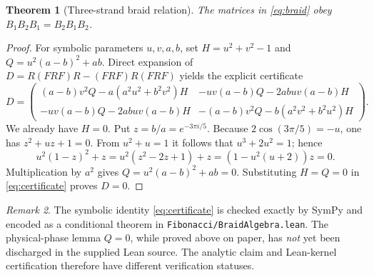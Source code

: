\documentclass[11pt,a4paper]{article}
\newtheorem{theorem}{Theorem}[section]
\theoremstyle{remark}
\newtheorem{remark}[theorem]{Remark}
\begin{document}
\begin{theorem}[Three-strand braid relation]\label{thm:braid}
The matrices in \eqref{eq:braid} obey $B_1B_2B_1=B_2B_1B_2$.
\end{theorem}
\begin{proof}
For symbolic parameters $u,v,a,b$, set
$H=u^2+v^2-1$ and $Q=u^2(a-b)^2+ab$. Direct expansion of
$D=R(FRF)R-(FRF)R(FRF)$ yields the explicit certificate
\begin{equation}\label{eq:certificate}
D=\begin{pmatrix}
(a-b)v^2Q-a(a^2u^2+b^2v^2)H & -uv(a-b)Q-2abuv(a-b)H\\
-uv(a-b)Q-2abuv(a-b)H & -(a-b)v^2Q-b(a^2v^2+b^2u^2)H
\end{pmatrix}.
\end{equation}
We already have $H=0$. Put $z=b/a=e^{-3\pi i/5}$. Because
$2\cos(3\pi/5)=-u$, one has $z^2+uz+1=0$. From $u^2+u=1$ it follows that $u^3+2u^2=1$; hence
\[
u^2(1-z)^2+z
=u^2(z^2-2z+1)+z
=(1-u^2(u+2))z=0.
\]
Multiplication by $a^2$ gives $Q=u^2(a-b)^2+ab=0$. Substituting $H=Q=0$ in \eqref{eq:certificate} proves $D=0$.
\end{proof}

\begin{remark}
The symbolic identity \eqref{eq:certificate} is checked exactly by SymPy and encoded as a conditional theorem in \texttt{Fibonacci/BraidAlgebra.lean}. The physical-phase lemma $Q=0$, while proved above on paper, has \emph{not} yet been discharged in the supplied Lean source. The analytic claim and Lean-kernel certification therefore have different verification statuses.
\end{remark}
\end{document}
